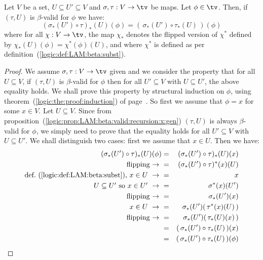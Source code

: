 \begin{prop}\label{logic:prop:LAM:beta:valid:composition:gen}
    Let $V$ be a set, $U\subseteq U' \subseteq V$ and $\sigma,\tau:V\to\tv$ 
    be maps. Let $\phi\in\tv$. Then, if $(\tau,U)$ is $\beta$-valid for $\phi$ 
    we have:
        \[
            (\sigma_{*}(U')\circ\tau)_{*}(U)(\phi)
            =(\,\sigma_{*}(U')\circ\tau_{*}(U)\,)(\phi)
        \]
    where for all $\chi:V\to\tv$, the map $\chi_{*}$ denotes the flipped version 
    of $\chi^{*}$ defined by $\chi_{*}(U)(\phi)=\chi^{*}(\phi)(U)$, and where 
    $\chi^{*}$ is defined as per definition~(\ref{logic:def:LAM:beta:subst}).
\end{prop}
\begin{proof}
    We assume $\sigma,\tau:V\to\tv$ given and we consider the property
    that for all $U\subseteq V$, if $(\tau, U)$ is $\beta$-valid for $\phi$
    then for all $U'\subseteq V$ with $U\subseteq U'$, the above equality
    holds. We shall prove this property by structural induction on $\phi$, 
    using theorem~(\ref{logic:the:proof:induction})
    of page~\pageref{logic:the:proof:induction}. So first we assume that 
    $\phi=x$ for some $x\in V$. Let $U\subseteq V$. Since from 
    proposition~(\ref{logic:prop:LAM:beta:valid:recursion:x:gen}) $(\tau,U)$ 
    is always $\beta$-valid for $\phi$, we simply need to prove that the 
    equality holds for all $U'\subseteq V$ with $U\subseteq U'$. We shall 
    distinguish two cases: first we assume that $x\in U$. Then we have:
        \begin{eqnarray*}(\sigma_{*}(U')\circ\tau)_{*}(U)(\phi)
            &=&(\sigma_{*}(U')\circ\tau)_{*}(U)(x)\\
            \mbox{flipping\ $\to$\ }
            &=&(\sigma_{*}(U')\circ\tau)^{*}(x)(U)\\
            \mbox{def.~(\ref{logic:def:LAM:beta:subst}), $x\in U\ \to\ $}
            &=&x\\
            \mbox{$U\subseteq U'$ so $x\in U'\ \to\ $}
            &=&\sigma^{*}(x)(U')\\
            \mbox{flipping\ $\to$\ }
            &=&\sigma_{*}(U')(x)\\
            \mbox{$x\in U\ \to\ $}
            &=&\sigma_{*}(U')(\,\tau^{*}(x)(U)\,)\\
            \mbox{flipping\ $\to$\ }
            &=&\sigma_{*}(U')(\,\tau_{*}(U)(x)\,)\\
            &=&(\,\sigma_{*}(U')\circ \tau_{*}(U)\,)(x)\\
            &=&(\,\sigma_{*}(U')\circ \tau_{*}(U)\,)(\phi)

\end{eqnarray*}
\end{proof}
